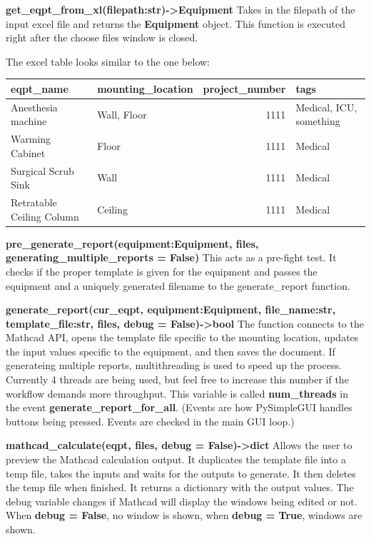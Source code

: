 \documentclass[11pt]{article}
\begin{document}
\textbf{get\_eqpt\_from\_xl(filepath:str)->Equipment}
    Takes in the filepath of the input excel file and returns the \textbf{Equipment} object. This function is executed right after the choose files window is closed.

The excel table looks similar to the one below:
\begin{center}
\begin{tabular}{llrl}
\hline
eqpt\_name & mounting\_location & project\_number & tags\\
\hline
Anesthesia machine & Wall, Floor & 1111 & Medical, ICU, something\\
Warming Cabinet & Floor & 1111 & Medical\\
Surgical Scrub Sink & Wall & 1111 & Medical\\
Retratable Ceiling Column & Ceiling & 1111 & Medical\\
\hline
\end{tabular}
\end{center}

\textbf{pre\_generate\_report(equipment:Equipment, files, generating\_multiple\_reports = False)}
    This acts as a pre-fight test. It checks if the proper template is given for the equipment and passes the equipment and a uniquely generated filename to the generate\_report function.

\textbf{generate\_report(cur\_eqpt, equipment:Equipment, file\_name:str, template\_file:str, files, debug = False)->bool}
    The function connects to the Mathcad API, opens the template file specific to the mounting location, updates the input values specific to the equipment, and then saves the document. If generateing multiple reports, multithreading is used to speed up the process. Currently 4 threads are being used, but feel free to increase this number if the workflow demands more throughput. This variable is called \textbf{num\_threads} in the event \textbf{generate\_report\_for\_all}. (Events are how PySimpleGUI handles buttons being pressed. Events are checked in the main GUI loop.)

\textbf{mathcad\_calculate(eqpt, files, debug = False)->dict}
    Allows the user to preview the Mathcad calculation output. It duplicates the template file into a temp file, takes the inputs and waits for the outputs to generate. It then deletes the temp file when finished. It returns a dictionary with the output values. The debug variable changes if Mathcad will display the windows being edited or not. When \textbf{debug = False}, no window is shown, when \textbf{debug = True}, windows are shown.
\end{document}
